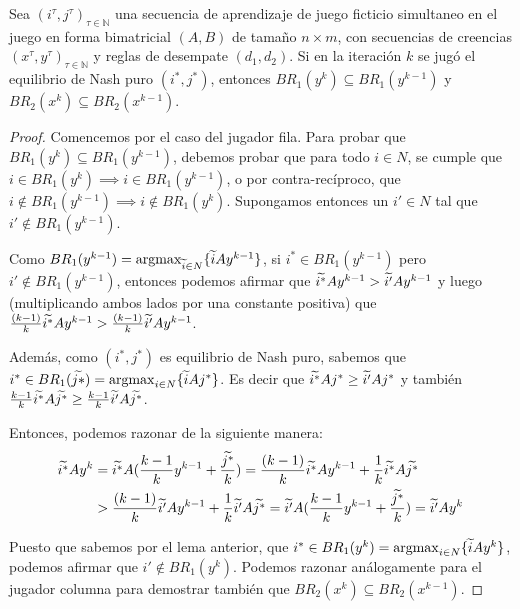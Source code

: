 \begin{lemma}
    Sea $(i^\tau, j^\tau)_{\tau \in \mathbb{N}}$ una secuencia de aprendizaje de juego ficticio simultaneo en el juego en forma bimatricial $(A, B)$ de tamaño $n \times m$, con secuencias de creencias $(x^\tau, y^\tau)_{\tau \in \mathbb{N}}$ y reglas de desempate $(d_1, d_2)$. Si en la iteración $k$ se jugó el equilibrio de Nash puro $(i^*, j^*)$, entonces $BR_1(y^{k}) \subseteq BR_1(y^{k-1})$ y $BR_2(x^{k}) \subseteq BR_2(x^{k-1})$.
\end{lemma}

\begin{proof}
    Comencemos por el caso del jugador fila. Para probar que $BR_1(y^{k}) \subseteq BR_1(y^{k-1})$, debemos probar que para todo $i \in N$, se cumple que $i \in BR_1(y^{k}) \implies i \in BR_1(y^{k-1})$, o por contra-recíproco, que $i \notin BR_1(y^{k-1}) \implies i \notin BR_1(y^{k})$. Supongamos entonces un $i' \in N$ tal que $i' \notin BR_1(y^{k-1})$.

    Como $BR_1(y^{k-1}) = \operatorname*{argmax}_{\widetilde{i} \in N} \{\widetilde{i}Ay^{k-1}\}$, si $i^* \in BR_1(y^{k-1})$ pero $i' \notin BR_1(y^{k-1})$, entonces podemos afirmar que $\widetilde{i^*}Ay^{k-1} > \widetilde{i'}Ay^{k-1}$ y luego (multiplicando ambos lados por una constante positiva) que $\frac{(k - 1)}{k} \widetilde{i^*}Ay^{k-1} > \frac{(k - 1)}{k} \widetilde{i'}Ay^{k-1}$.
    
    Además, como $(i^*, j^*)$ es equilibrio de Nash puro, sabemos que $i^* \in BR_1(\widetilde{j*}) = \operatorname*{argmax}_{i \in N} \{\widetilde{i}Aj^*\}$. Es decir que $\widetilde{i^*}Aj^* \ge \widetilde{i'}Aj^*$ y también $\frac{k - 1}{k} \widetilde{i^*}A\widetilde{j^*} \ge \frac{k - 1}{k} \widetilde{i'}A\widetilde{j^*}$.

    Entonces, podemos razonar de la siguiente manera:
    \begin{align*}
        \widetilde{i^*}Ay^k &= \widetilde{i^*}A(\frac{k - 1}{k} y^{k-1} + \frac{\widetilde{j^*}}{k}) = \frac{(k - 1)}{k} \widetilde{i^*}Ay^{k-1} + \frac{1}{k}\widetilde{i^*}A\widetilde{j^*}\\
        &> \frac{(k - 1)}{k} \widetilde{i'}Ay^{k-1} + \frac{1}{k}\widetilde{i'}A\widetilde{j^*} = \widetilde{i'}A(\frac{k - 1}{k} y^{k-1} + \frac{\widetilde{j^*}}{k}) = \widetilde{i'}Ay^k
    \end{align*}

    Puesto que sabemos por el lema anterior, que $i^* \in BR_1(y^{k}) = \operatorname*{argmax}_{i \in N} \{\widetilde{i}Ay^{k}\}$, podemos afirmar que $i' \notin BR_1(y^{k})$.
    Podemos razonar análogamente para el jugador columna para demostrar también que $BR_2(x^{k}) \subseteq BR_2(x^{k-1})$.
\end{proof}

